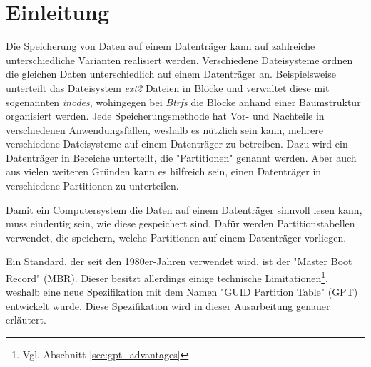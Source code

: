 \section{Einleitung}
Die Speicherung von Daten auf einem Datenträger kann auf zahlreiche unterschiedliche Varianten realisiert werden.
Verschiedene Dateisysteme ordnen die gleichen Daten unterschiedlich auf einem Datenträger an.
Beispielsweise unterteilt das Dateisystem \textit{ext2} Dateien in Blöcke und verwaltet diese mit sogenannten \textit{inodes}, wohingegen bei \textit{Btrfs} die Blöcke anhand einer Baumstruktur organisiert werden. 
Jede Speicherungsmethode hat Vor- und Nachteile in verschiedenen Anwendungsfällen, weshalb es nützlich sein kann, mehrere verschiedene Dateisysteme auf einem Datenträger zu betreiben.
Dazu wird ein Datenträger in Bereiche unterteilt, die "Partitionen" genannt werden.
Aber auch aus vielen weiteren Gründen kann es hilfreich sein, einen Datenträger in verschiedene Partitionen zu unterteilen.

Damit ein Computersystem die Daten auf einem Datenträger sinnvoll lesen kann, muss eindeutig sein, wie diese gespeichert sind.
Dafür werden Partitionstabellen verwendet, die speichern, welche Partitionen auf einem Datenträger vorliegen.

Ein Standard, der seit den 1980er-Jahren verwendet wird, ist der "Master Boot Record" (MBR).
Dieser besitzt allerdings einige technische Limitationen\footnote{Vgl. Abschnitt \ref{sec:gpt_advantages}}, weshalb eine neue Spezifikation mit dem Namen "GUID Partition Table" (GPT) entwickelt wurde.\cite{drive-partition-limits}
Diese Spezifikation wird in dieser Ausarbeitung genauer erläutert.
